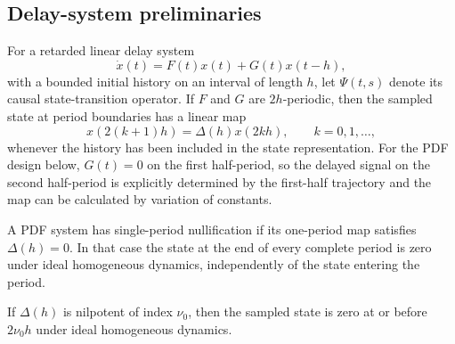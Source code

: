 \subsection{Delay-system preliminaries}
For a retarded linear delay system
\begin{equation}
 \dot x(t)=F(t)x(t)+G(t)x(t-h),
 \label{eq:abstract_delay_system}
\end{equation}
with a bounded initial history on an interval of length $h$, let $\Psi(t,s)$
denote its causal state-transition operator. If $F$ and $G$ are $2h$-periodic,
then the sampled state at period boundaries has a linear map
\begin{equation}
 x(2(k+1)h)=\Delta(h)x(2kh),\qquad k=0,1,\ldots,
 \label{eq:period_map_abstract}
\end{equation}
whenever the history has been included in the state representation. For the
PDF design below, $G(t)=0$ on the first half-period, so the delayed signal on
the second half-period is explicitly determined by the first-half trajectory
and the map can be calculated by variation of constants.

\begin{definition}\label{def:single_period_nullification}
A PDF system has single-period nullification if its one-period map satisfies
$\Delta(h)=0$. In that case the state at the end of every complete period is
zero under ideal homogeneous dynamics, independently of the state entering the
period.
\end{definition}
\begin{definition}\label{def:nilpotent_nullification}
If $\Delta(h)$ is nilpotent of index $\nu_0$, then the sampled state is zero
at or before $2\nu_0h$ under ideal homogeneous dynamics.
\end{definition}
